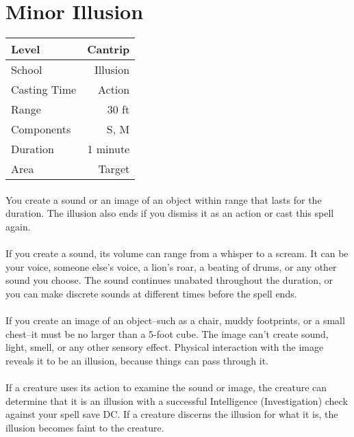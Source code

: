 \documentclass[a5paper,12pt]{article}
\begin{document}
\section*{Minor Illusion}
\begin{table}[h]
   \centering
   \begin{tabular}{|l|r|}
      \hline
      Level        & Cantrip \\
      \hline
      School       & Illusion\\
      \hline
      Casting Time & Action \\
      \hline
      Range        & 30 ft \\
      \hline
      Components   & S, M \\
      \hline
      Duration     & 1 minute\\
      \hline
      Area         & Target \\
      \hline
   \end{tabular}
\end{table}

\paragraph{}
You create a sound or an image of an object within range that lasts for the duration. The illusion also ends if you dismiss it as an action or cast this spell again.

\paragraph{}
If you create a sound, its volume can range from a whisper to a scream. It can be your voice, someone else's voice, a lion's roar, a beating of drums, or any other sound you choose. The sound continues unabated throughout the duration, or you can make discrete sounds at different times before the spell ends.

\paragraph{}
If you create an image of an object--such as a chair, muddy footprints, or a small chest--it must be no larger than a 5-foot cube. The image can't create sound, light, smell, or any other sensory effect. Physical interaction with the image reveals it to be an illusion, because things can pass through it.

\paragraph{}
If a creature uses its action to examine the sound or image, the creature can determine that it is an illusion with a successful Intelligence (Investigation) check against your spell save DC. If a creature discerns the illusion for what it is, the illusion becomes faint to the creature.
\end{document}
